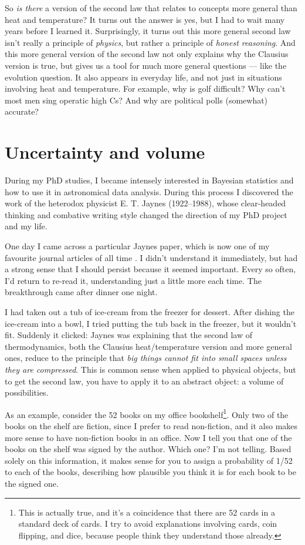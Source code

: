 \documentclass[a4paper, 12pt]{article}
\begin{document}
So {\em is there} a version of the second law that relates to concepts more
general than heat and temperature?
It turns out the answer is yes, but I had to wait many years before I learned it.
Surprisingly, it turns out this more general second law isn't really a
principle of {\em physics}, but rather a
principle of {\em honest reasoning}. And this more general version of the
second law not only explains why the Clausius version is true, but gives us
a tool for much more general questions --- like the evolution question.
It also appears in everyday life, and not just in situations involving heat and
temperature. For example,
why is golf difficult? Why can't most men sing operatic high Cs?
And why are political polls (somewhat) accurate?

\section*{Uncertainty and volume}
During my PhD studies, I became intensely interested in Bayesian statistics
\citep{brewer}
and how to use it in astronomical data analysis. During this process I
discovered the work of the heterodox physicist E. T. Jaynes \citep{jaynes_site}
(1922--1988), whose clear-headed thinking and combative writing style
changed the direction of my PhD project and my life.

One day I came across a particular Jaynes paper, which is now one of my
favourite journal articles of all time
\citep{jaynes}. I didn't understand it
immediately, but had a strong sense that I should persist because it seemed
important. Every so often, I'd return to re-read it, understanding
just a little more each time. The breakthrough came after dinner one
night.

I had taken out a tub of ice-cream from the freezer for dessert. After dishing
the ice-cream into a bowl, I tried putting the tub back in the freezer, but
it wouldn't fit. Suddenly it clicked: Jaynes was explaining that
the second law of thermodynamics, both the Clausius heat/temperature version
and more general ones, reduce to the
principle that {\em big things cannot fit into small spaces unless they are
compressed}. This is common sense when applied to physical objects, but to
get the second law, you have to apply it to an abstract object: a volume
of possibilities.

As an example, consider the 52 books on my office bookshelf\footnote{This
is actually true, and it's a coincidence that there are 52 cards in a standard
deck of cards. I try to avoid explanations involving cards, coin flipping, and
dice, because people think they understand those already.}.
Only two of the books on the shelf are fiction, since I prefer to read
non-fiction, and it also makes more sense to have non-fiction books in an
office. Now I tell you that one of the books on the shelf was
signed by the author. Which one? I'm not telling. Based solely on this
information, it makes sense for you to assign a probability of 1/52 to each of the
books, describing how plausible you think it is for each book to be the signed
one.
\end{document}
